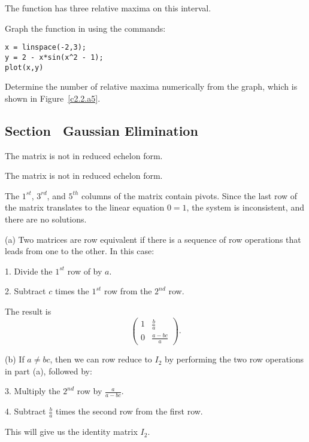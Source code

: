 \ans The function has three relative maxima on this interval.

\soln Graph the function in \Matlab using the commands:
\begin{verbatim}
x = linspace(-2,3);
y = 2 - x*sin(x^2 - 1);
plot(x,y)
\end{verbatim}
Determine the number of relative maxima numerically from the graph, which
is shown in Figure~\ref{c2.2.a5}.

\begin{figure}[htb]
                       \centerline{%
                       }
\end{figure}



\subsection*{Section~\protect{\ref{S:Gauss}} Gaussian Elimination}

 The matrix is not in reduced echelon form.

 The matrix is not in reduced echelon form.

 The $1^{st}$, $3^{rd}$, and $5^{th}$ columns of the matrix
contain pivots.  Since the last row of the matrix translates to the linear
equation $0 = 1$, the system is inconsistent, and there are no solutions.

(a)
Two matrices are row equivalent if there is a sequence of row operations
that leads from one to the other.  In this case:

1. Divide the $1^{st}$ row of  by $a$.

2. Subtract $c$ times the $1^{st}$ row from the $2^{nd}$ row.

The result is
\[
\left(\begin{array}{cc} 1 & \frac{b}{a} \\ 0 & \frac{a - bc}{a}\end{array}
\right).
\]

(b) If $a \neq bc$, then we can row reduce  to $I_2$ by
performing the two row operations in part (a), followed by:

3. Multiply the $2^{nd}$ row by $\frac{a}{a - bc}$.

4. Subtract $\frac{b}{a}$ times the second row from the first row.

This will give us the identity matrix $I_2$.

